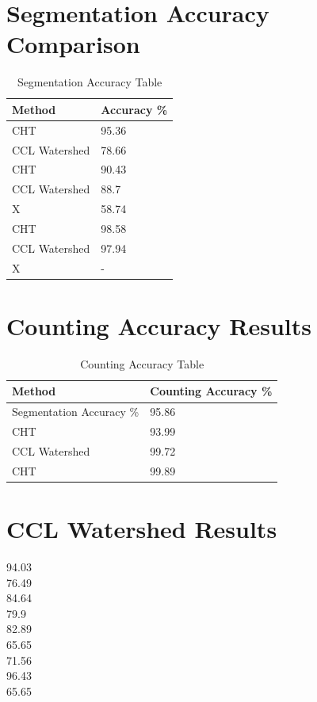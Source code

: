 \documentclass[conference]{IEEEtran}
\begin{document}
\section{Segmentation Accuracy Comparison}
\begin{table}[htbp]
\centering
\caption{Segmentation Accuracy Table}
\label{tab:segmentation_accuracy}
\begin{tabular}{ll}
\hline
Method & Accuracy \% \\
\hline
CHT & 95.36 \\
CCL Watershed & 78.66 \\
CHT & 90.43 \\
CCL Watershed & 88.7 \\
X & 58.74 \\
CHT & 98.58 \\
CCL Watershed & 97.94 \\
X & - \\
\hline
\end{tabular}
\end{table}
\section{Counting Accuracy Results}
\begin{table}[htbp]
\centering
\caption{Counting Accuracy Table}
\label{tab:counting_accuracy}
\begin{tabular}{ll}
\hline
Method & Counting Accuracy \% \\
\hline
Segmentation Accuracy \% & 95.86 \\
CHT & 93.99 \\
CCL Watershed & 99.72 \\
CHT & 99.89 \\
\hline
\end{tabular}
\end{table}

\section{CCL Watershed Results}
94.03 \\
76.49 \\
84.64 \\
79.9 \\
82.89 \\
65.65 \\
71.56 \\
96.43 \\
65.65 \\
\end{document}
